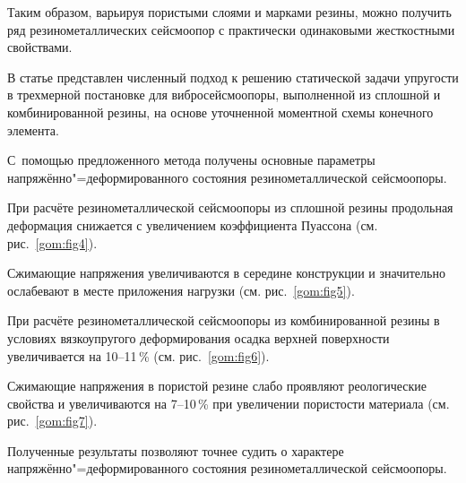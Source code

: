 Таким образом, варьируя пористыми слоями и марками резины, можно получить ряд резинометаллических сейсмоопор с практически одинаковыми жесткостными свойствами.









\smallskip





 В статье представлен численный подход к решению статической задачи упругости в трехмерной постановке для вибросейсмоопоры, выполненной из сплошной и комбинированной резины, на основе уточненной моментной схемы конечного элемента. 

С~помощью предложенного метода получены основные параметры напряжённо"=деформированного состояния резинометаллической сейсмоопоры.



При расчёте резинометаллической сейсмоопоры из сплошной резины продольная деформация снижается с увеличением коэффициента Пуассона (см. рис.~\ref{gom:fig4}). 

Сжимающие напряжения увеличиваются в середине конструкции и значительно ослабевают в месте приложения нагрузки (см. рис.~\ref{gom:fig5}).





При расчёте резинометаллической сейсмоопоры  из комбинированной резины в условиях вязкоупругого деформирования осадка верхней поверхности увеличивается на 10--11\,\% (см. рис.~\ref{gom:fig6}). 

Сжимающие напряжения в пористой резине слабо проявляют реологические свойства и увеличиваются на 7--10\,\% при увеличении пористости материала (см. рис.~\ref{gom:fig7}).



Полученные результаты позволяют точнее судить о характере напряжённо"=деформированного состояния резинометаллической сейсмоопоры.




